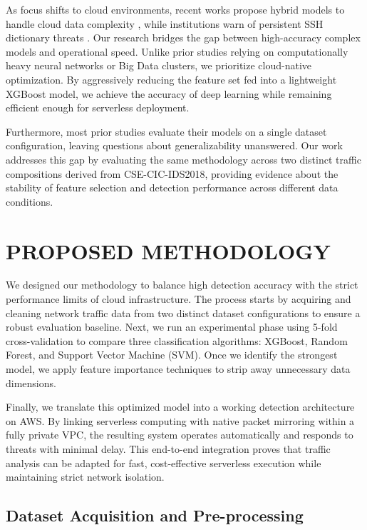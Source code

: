 \documentclass[conference]{IEEEtran}
\begin{document}
As focus shifts to cloud environments, recent works propose hybrid models to handle cloud data complexity \cite{b12}, while institutions warn of persistent SSH dictionary threats \cite{b11}. Our research bridges the gap between high-accuracy complex models and operational speed. Unlike prior studies relying on computationally heavy neural networks or Big Data clusters, we prioritize cloud-native optimization. By aggressively reducing the feature set fed into a lightweight XGBoost model, we achieve the accuracy of deep learning while remaining efficient enough for serverless deployment.

Furthermore, most prior studies evaluate their models on a single dataset configuration, leaving questions about generalizability unanswered. Our work addresses this gap by evaluating the same methodology across two distinct traffic compositions derived from CSE-CIC-IDS2018, providing evidence about the stability of feature selection and detection performance across different data conditions.

\section{PROPOSED METHODOLOGY}

We designed our methodology to balance high detection accuracy with the strict performance limits of cloud infrastructure. The process starts by acquiring and cleaning network traffic data from two distinct dataset configurations to ensure a robust evaluation baseline. Next, we run an experimental phase using 5-fold cross-validation to compare three classification algorithms: XGBoost, Random Forest, and Support Vector Machine (SVM). Once we identify the strongest model, we apply feature importance techniques to strip away unnecessary data dimensions.

Finally, we translate this optimized model into a working detection architecture on AWS. By linking serverless computing with native packet mirroring within a fully private VPC, the resulting system operates automatically and responds to threats with minimal delay. This end-to-end integration proves that traffic analysis can be adapted for fast, cost-effective serverless execution while maintaining strict network isolation.

\subsection{Dataset Acquisition and Pre-processing}
\end{document}

